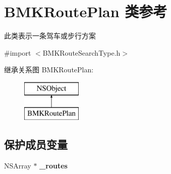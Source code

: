 \hypertarget{interface_b_m_k_route_plan}{\section{B\-M\-K\-Route\-Plan 类参考}
\label{interface_b_m_k_route_plan}
}


此类表示一条驾车或步行方案  




{\ttfamily \#import $<$B\-M\-K\-Route\-Search\-Type.\-h$>$}

继承关系图 B\-M\-K\-Route\-Plan\-:\begin{figure}[H]
\begin{center}
\leavevmode
\includegraphics[height=2.000000cm]{interface_b_m_k_route_plan}
\end{center}
\end{figure}
\subsection*{保护成员变量}
\begin{DoxyCompactItemize}
\item 
\hypertarget{interface_b_m_k_route_plan_aa62820a95ab248f113a882b864230135}{N\-S\-Array $\ast$ {\bfseries \-\_\-routes}}\label{interface_b_m_k_route_plan_aa62820a95ab248f113a882b864230135}

\end{DoxyCompactItemize}

